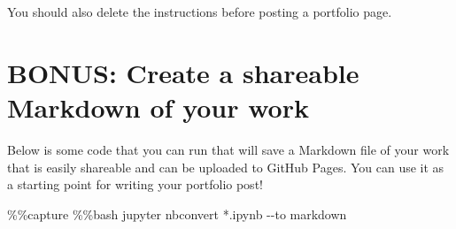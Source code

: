 \documentclass[
  letterpaper,
  DIV=11,
  numbers=noendperiod,
  oneside]{scrreprt}
\newenvironment{Shaded}{\begin{snugshade}}{\end{snugshade}}
\newcommand{\NormalTok}[1]{\textcolor[rgb]{0.00,0.23,0.31}{#1}}
\newcommand{\OperatorTok}[1]{\textcolor[rgb]{0.37,0.37,0.37}{#1}}
\begin{document}
You should also delete the instructions before posting a portfolio page.

\section{BONUS: Create a shareable Markdown of your
work}\label{bonus-create-a-shareable-markdown-of-your-work-1}

Below is some code that you can run that will save a Markdown file of
your work that is easily shareable and can be uploaded to GitHub Pages.
You can use it as a starting point for writing your portfolio post!

\begin{Shaded}
\begin{Highlighting}[]
\OperatorTok{\%\%}\NormalTok{capture}
\OperatorTok{\%\%}\NormalTok{bash}
\NormalTok{jupyter nbconvert }\OperatorTok{*}\NormalTok{.ipynb }\OperatorTok{{-}{-}}\NormalTok{to markdown}
\end{Highlighting}
\end{Shaded}
\end{document}
